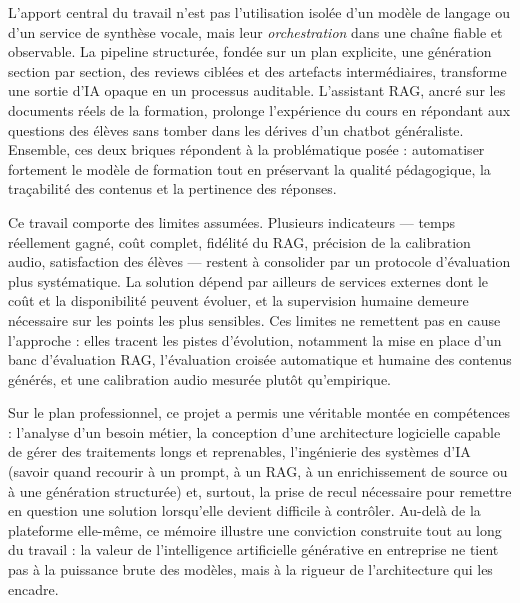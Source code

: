 \documentclass[12pt,a4paper]{article}
\begin{document}
L'apport central du travail n'est pas l'utilisation isolée d'un modèle de langage ou d'un service
de synthèse vocale, mais leur \emph{orchestration} dans une chaîne fiable et observable. La
pipeline structurée, fondée sur un plan explicite, une génération section par section, des
reviews ciblées et des artefacts intermédiaires, transforme une sortie d'IA opaque en un
processus auditable. L'assistant RAG, ancré sur les documents réels de la formation, prolonge
l'expérience du cours en répondant aux questions des élèves sans tomber dans les dérives d'un
chatbot généraliste. Ensemble, ces deux briques répondent à la problématique posée :
automatiser fortement le modèle de formation tout en préservant la qualité pédagogique, la
traçabilité des contenus et la pertinence des réponses.

Ce travail comporte des limites assumées. Plusieurs indicateurs — temps réellement gagné,
coût complet, fidélité du RAG, précision de la calibration audio, satisfaction des élèves —
restent à consolider par un protocole d'évaluation plus systématique. La solution dépend par
ailleurs de services externes dont le coût et la disponibilité peuvent évoluer, et la supervision
humaine demeure nécessaire sur les points les plus sensibles. Ces limites ne remettent pas en
cause l'approche : elles tracent les pistes d'évolution, notamment la mise en place d'un banc
d'évaluation RAG, l'évaluation croisée automatique et humaine des contenus générés, et une
calibration audio mesurée plutôt qu'empirique.

Sur le plan professionnel, ce projet a permis une véritable montée en compétences :
l'analyse d'un besoin métier, la conception d'une architecture logicielle capable de gérer des
traitements longs et reprenables, l'ingénierie des systèmes d'IA (savoir quand recourir à un
prompt, à un RAG, à un enrichissement de source ou à une génération structurée) et, surtout,
la prise de recul nécessaire pour remettre en question une solution lorsqu'elle devient
difficile à contrôler. Au-delà de la plateforme elle-même, ce mémoire illustre une conviction
construite tout au long du travail : la valeur de l'intelligence artificielle générative en
entreprise ne tient pas à la puissance brute des modèles, mais à la rigueur de l'architecture
qui les encadre.
\end{document}
